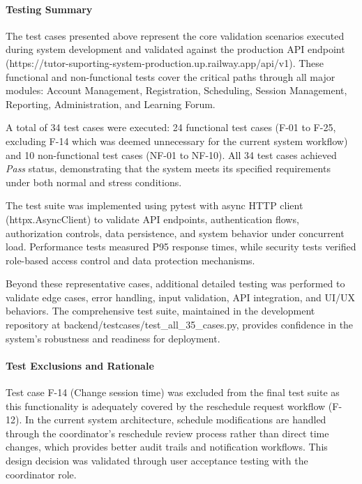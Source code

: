 \paragraph*{Testing Summary}


The test cases presented above represent the core validation scenarios executed during system development and validated against the production API endpoint (https://tutor-suporting-system-production.up.railway.app/api/v1). These functional and non-functional tests cover the critical paths through all major modules: Account Management, Registration, Scheduling, Session Management, Reporting, Administration, and Learning Forum.

A total of 34 test cases were executed: 24 functional test cases (F-01 to F-25, excluding F-14 which was deemed unnecessary for the current system workflow) and 10 non-functional test cases (NF-01 to NF-10). All 34 test cases achieved \textit{Pass} status, demonstrating that the system meets its specified requirements under both normal and stress conditions.

The test suite was implemented using pytest with async HTTP client (httpx.AsyncClient) to validate API endpoints, authentication flows, authorization controls, data persistence, and system behavior under concurrent load. Performance tests measured P95 response times, while security tests verified role-based access control and data protection mechanisms.

Beyond these representative cases, additional detailed testing was performed to validate edge cases, error handling, input validation, API integration, and UI/UX behaviors. The comprehensive test suite, maintained in the development repository at backend/testcases/test\_all\_35\_cases.py, provides confidence in the system's robustness and readiness for deployment.

\paragraph*{Test Exclusions and Rationale}

Test case F-14 (Change session time) was excluded from the final test suite as this functionality is adequately covered by the reschedule request workflow (F-12). In the current system architecture, schedule modifications are handled through the coordinator's reschedule review process rather than direct time changes, which provides better audit trails and notification workflows. This design decision was validated through user acceptance testing with the coordinator role.
